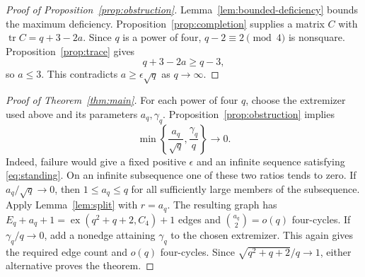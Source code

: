 \documentclass[11pt,reqno]{amsart}
\theoremstyle{definition}
\theoremstyle{remark}
\numberwithin{equation}{section}
\DeclareMathOperator{\ex}{ex}
\DeclareMathOperator{\tr}{tr}
\begin{document}
\begin{proof}[Proof of Proposition~\ref{prop:obstruction}]
Lemma~\ref{lem:bounded-deficiency} bounds the maximum deficiency.
Proposition~\ref{prop:completion} supplies a matrix $C$ with
$\tr C=q+3-2a$. Since $q$ is a power of four, $q-2\equiv2\pmod4$
is nonsquare. Proposition~\ref{prop:trace} gives
\[
 q+3-2a\ge q-3,
\]
so $a\le3$. This contradicts $a\ge\epsilon\sqrt q$ as $q\to\infty$.
\end{proof}

\begin{proof}[Proof of Theorem~\ref{thm:main}]
For each power of four $q$, choose the extremizer used above and its
parameters $a_q,\gamma_q$. Proposition~\ref{prop:obstruction} implies
\[
 \min\left\{\frac{a_q}{\sqrt q},\frac{\gamma_q}{q}\right\}
 \longrightarrow0.
\]
Indeed, failure would give a fixed positive $\epsilon$ and an infinite
sequence satisfying \eqref{eq:standing}. On an infinite subsequence
one of these two ratios tends to zero. If $a_q/\sqrt q\to0$, then
$1\le a_q\le q$ for all sufficiently large members of the subsequence.
Apply Lemma~\ref{lem:split} with $r=a_q$. The resulting graph has
$E_q+a_q+1=\ex(q^2+q+2,C_4)+1$ edges and
$\binom{a_q}2=o(q)$ four-cycles. If $\gamma_q/q\to0$, add a nonedge
attaining $\gamma_q$ to the chosen extremizer. This again gives the
required edge count and $o(q)$ four-cycles. Since
$\sqrt{q^2+q+2}/q\to1$, either alternative proves the theorem.
\end{proof}
\end{document}
